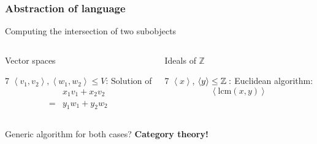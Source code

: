 \begin{frame}[fragile]
 \frametitle{Abstraction of language}
 \begin{block}{Computing the intersection of two subobjects}
  \begin{columns}[onlytextwidth, t]
  \pause
  \begin{block}{Vector spaces}
  \begin{overlayarea}{\linewidth}{7\baselineskip}
  $\left\langle v_1, v_2 \right\rangle, \left\langle w_1, w_2 \right\rangle \leq V$:\newline \pause
  Solution of
  \begin{align*}
   & x_1v_1 + x_2 v_2 \\
   = & y_1w_1 +y_2w_2
  \end{align*}
  \end{overlayarea}
  \end{block} \pause
  \begin{block}{Ideals of $\mathbb{Z}$\vphantom{Vector spaces}} \pause
  \begin{overlayarea}{\linewidth}{7\baselineskip}
  $\left\langle x\right\rangle$, $\left\langle y\right\rangle \leq \mathbb{Z}:$\newline \pause
  Euclidean algorithm:
  \[
   \left\langle \mathrm{lcm} \left( x,y \right) \right\rangle
  \]
  
  \end{overlayarea}
  \end{block}\pause
  \end{columns}
 \begin{center}
 Generic algorithm for both cases? \pause
 \textbf{Category theory!}
 \end{center}
 \end{block}
\end{frame}

